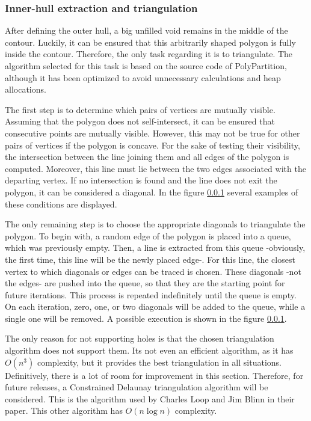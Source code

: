 \documentclass[\topdir/main.tex]{subfiles}
\begin{document}
\subsubsection{Inner-hull extraction and triangulation}
After defining the outer hull, a big unfilled void remains in the middle of the contour. Luckily, it can be ensured that this arbitrarily shaped polygon is fully inside the contour. Therefore, the only task regarding it is to triangulate. The algorithm selected for this task is based on the source code of PolyPartition\cite{polypartition}, although it has been optimized to avoid unnecessary calculations and heap allocations.\newline

The first step is to determine which pairs of vertices are mutually visible. Assuming that the polygon does not self-intersect, it can be ensured that consecutive points are mutually visible. However, this may not be true for other pairs of vertices if the polygon is concave. For the sake of testing their visibility, the intersection between the line joining them and all edges of the polygon is computed. Moreover, this line must lie between the two edges associated with the departing vertex. If no intersection is found and the line does not exit the polygon, it can be considered a diagonal. In the figure \ref{} several examples of these conditions are displayed.\newline

The only remaining step is to choose the appropriate diagonals to triangulate the polygon. To begin with, a random edge of the polygon is placed into a queue, which was previously empty. Then, a line is extracted from this queue -obviously, the first time, this line will be the newly placed edge-. For this line, the closest vertex to which diagonals or edges can be traced is chosen. These diagonals -not the edges- are pushed into the queue, so that they are the starting point for future iterations. This process is repeated indefinitely until the queue is empty. On each iteration, zero, one, or two diagonals will be added to the queue, while a single one will be removed. A possible execution is shown in the figure \ref{}.\newline

The only reason for not supporting holes is that the chosen triangulation algorithm does not support them. Its not even an efficient algorithm, as it has $O(n^3)$ complexity, but it provides the best triangulation in all situations. Definitively, there is a lot of room for improvement in this section. Therefore, for future releases, a Constrained Delaunay triangulation algorithm will be considered. This is the algorithm used by Charles Loop and Jim Blinn in their paper\cite{loopblinn2005}. This other algorithm has $O(n \log n)$ complexity\cite{wiki:constrained_delaunay}.\newline
\end{document}
